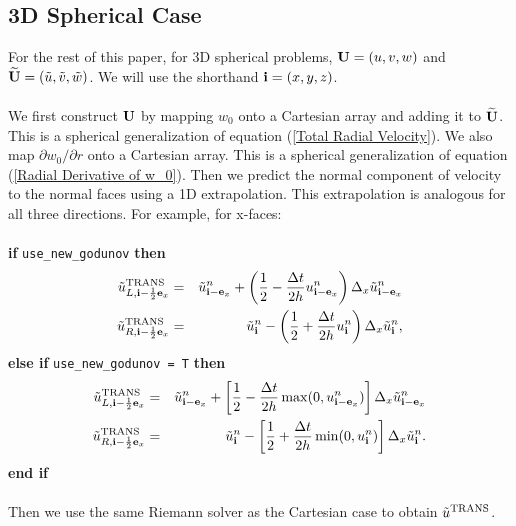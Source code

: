 \subsection{3D Spherical Case}
For the rest of this paper, for 3D spherical problems, ${\bf U} = (u,v,w)$
and $\widetilde{{\bf U}} = (\tilde{u},\tilde{v},\tilde{w})$.  We will use the shorthand ${\bf i} =
(x,y,z)$.\\ \\
We first construct ${\bf U}$ by mapping $w_0$ onto a Cartesian array and
adding it to $\widetilde{{\bf U}}$.  This is a spherical generalization of equation
(\ref{Total Radial Velocity}).  We also map $\partial w_0/\partial r$
onto a Cartesian array.  This is a spherical generalization of
equation (\ref{Radial Derivative of w_0}).  Then we predict the normal 
component of velocity to the normal faces using a 1D extrapolation.  
This extrapolation is analogous for all three directions.
For example, for x-faces:\\ \\
{\bf if} {\tt use\_new\_godunov} {\bf then}
\begin{eqnarray}
\tilde{u}_{L,{\bf i}-\frac{1}{2}{\bf e}_x}^{\rm TRANS} &=& \tilde{u}_{{\bf i}-{\bf e}_x}^n + \left(\frac{1}{2} - \frac{\Delta t}{2h}u_{{\bf i}-{\bf e}_x}^n\right)\Delta_x\tilde{u}_{{\bf i}-{\bf e}_x}^n \\
\tilde{u}_{R,{\bf i}-\frac{1}{2}{\bf e}_x}^{\rm TRANS} &=& \tilde{u}_{{\bf i}}^n - \left(\frac{1}{2} + \frac{\Delta t}{2h}u_{{\bf i}}^n\right)\Delta_x\tilde{u}_{{\bf i}}^n ,
\end{eqnarray}
{\bf else if} {\tt use\_new\_godunov = T} {\bf then}
\begin{eqnarray}
\tilde{u}_{L,{\bf i}-\frac{1}{2}{\bf e}_x}^{\rm TRANS} &=& \tilde{u}_{{\bf i}-{\bf e}_x}^n + \left[\frac{1}{2} - \frac{\Delta t}{2h}\max(0,u_{{\bf i}-{\bf e}_x}^n)\right]\Delta_x\tilde{u}_{{\bf i}-{\bf e}_x}^n \\
\tilde{u}_{R,{\bf i}-\frac{1}{2}{\bf e}_x}^{\rm TRANS} &=& \tilde{u}_{{\bf i}}^n - \left[\frac{1}{2} + \frac{\Delta t}{2h}\min(0,u_{{\bf i}}^n)\right]\Delta_x\tilde{u}_{{\bf i}}^n.
\end{eqnarray}
{\bf end if}\\ \\
Then we use the same Riemann solver as the Cartesian case to 
obtain $\tilde{u}^{\rm TRANS}$.

\newpage

